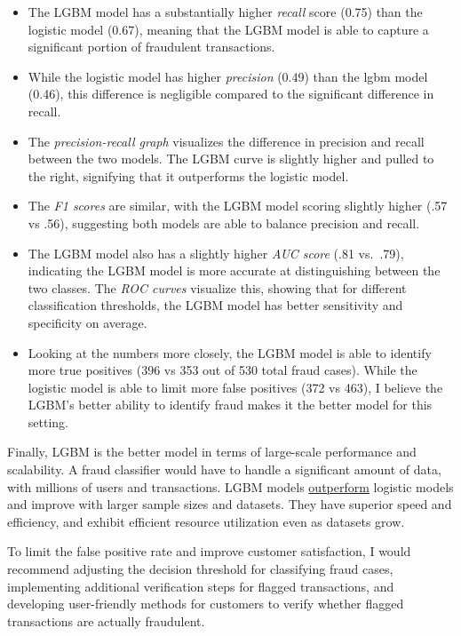 \documentclass[
  letterpaper,
  DIV=11,
  numbers=noendperiod]{scrartcl}
\providecommand{\tightlist}{%
  \setlength{\itemsep}{0pt}\setlength{\parskip}{0pt}}\usepackage{longtable,booktabs,array}
\begin{document}
\begin{itemize}
\tightlist
\item
  The LGBM model has a substantially higher \emph{recall} score (0.75)
  than the logistic model (0.67), meaning that the LGBM model is able to
  capture a significant portion of fraudulent transactions.
\item
  While the logistic model has higher \emph{precision} (0.49) than the
  lgbm model (0.46), this difference is negligible compared to the
  significant difference in recall.
\item
  The \emph{precision-recall graph} visualizes the difference in
  precision and recall between the two models. The LGBM curve is
  slightly higher and pulled to the right, signifying that it
  outperforms the logistic model.
\item
  The \emph{F1 scores} are similar, with the LGBM model scoring slightly
  higher (.57 vs .56), suggesting both models are able to balance
  precision and recall.
\item
  The LGBM model also has a slightly higher \emph{AUC score} (.81
  vs.~.79), indicating the LGBM model is more accurate at distinguishing
  between the two classes. The \emph{ROC curves} visualize this, showing
  that for different classification thresholds, the LGBM model has
  better sensitivity and specificity on average.
\item
  Looking at the numbers more closely, the LGBM model is able to
  identify more true positives (396 vs 353 out of 530 total fraud
  cases). While the logistic model is able to limit more false positives
  (372 vs 463), I believe the LGBM's better ability to identify fraud
  makes it the better model for this setting.
\end{itemize}

Finally, LGBM is the better model in terms of large-scale performance
and scalability. A fraud classifier would have to handle a significant
amount of data, with millions of users and transactions. LGBM models
\href{https://www.nature.com/articles/s41598-022-20149-z?utm_source=chatgpt.com}{outperform}
logistic models and improve with larger sample sizes and datasets. They
have superior speed and efficiency, and exhibit efficient resource
utilization even as datasets grow.

To limit the false positive rate and improve customer satisfaction, I
would recommend adjusting the decision threshold for classifying fraud
cases, implementing additional verification steps for flagged
transactions, and developing user-friendly methods for customers to
verify whether flagged transactions are actually fraudulent.
\end{document}
